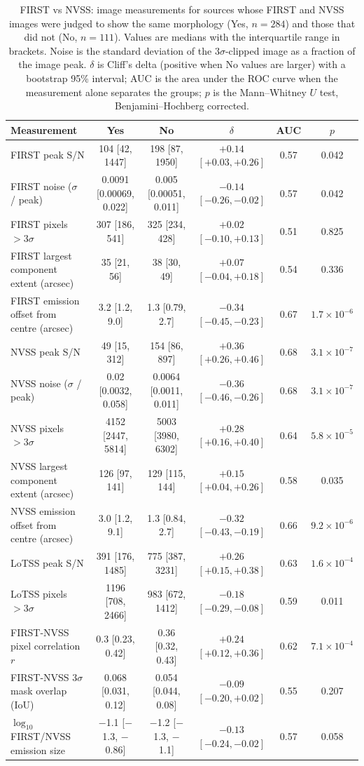 \begin{table}
\centering
\caption{FIRST vs NVSS: image measurements for sources whose FIRST and NVSS images were judged to show the same morphology (Yes, $n=284$) and those that did not (No, $n=111$). Values are medians with the interquartile range in brackets. Noise is the standard deviation of the $3\sigma$-clipped image as a fraction of the image peak. $\delta$ is Cliff's delta (positive when No values are larger) with a bootstrap 95\% interval; AUC is the area under the ROC curve when the measurement alone separates the groups; $p$ is the Mann--Whitney $U$ test, Benjamini--Hochberg corrected.}
\label{tab:morphology_review_FIRST_vs_NVSS}
\begin{tabular}{lccccc}
\hline
Measurement & Yes & No & $\delta$ & AUC & $p$ \\
\hline
FIRST peak S/N & 104 [42, 1447] & 198 [87, 1950] & $+0.14$ $[+0.03, +0.26]$ & 0.57 & 0.042 \\
FIRST noise ($\sigma$ / peak) & 0.0091 [0.00069, 0.022] & 0.005 [0.00051, 0.011] & $-0.14$ $[-0.26, -0.02]$ & 0.57 & 0.042 \\
FIRST pixels $>3\sigma$ & 307 [186, 541] & 325 [234, 428] & $+0.02$ $[-0.10, +0.13]$ & 0.51 & 0.825 \\
FIRST largest component extent (arcsec) & 35 [21, 56] & 38 [30, 49] & $+0.07$ $[-0.04, +0.18]$ & 0.54 & 0.336 \\
FIRST emission offset from centre (arcsec) & 3.2 [1.2, 9.0] & 1.3 [0.79, 2.7] & $-0.34$ $[-0.45, -0.23]$ & 0.67 & $1.7\times10^{-6}$ \\
NVSS peak S/N & 49 [15, 312] & 154 [86, 897] & $+0.36$ $[+0.26, +0.46]$ & 0.68 & $3.1\times10^{-7}$ \\
NVSS noise ($\sigma$ / peak) & 0.02 [0.0032, 0.058] & 0.0064 [0.0011, 0.011] & $-0.36$ $[-0.46, -0.26]$ & 0.68 & $3.1\times10^{-7}$ \\
NVSS pixels $>3\sigma$ & 4152 [2447, 5814] & 5003 [3980, 6302] & $+0.28$ $[+0.16, +0.40]$ & 0.64 & $5.8\times10^{-5}$ \\
NVSS largest component extent (arcsec) & 126 [97, 141] & 129 [115, 144] & $+0.15$ $[+0.04, +0.26]$ & 0.58 & 0.035 \\
NVSS emission offset from centre (arcsec) & 3.0 [1.2, 9.1] & 1.3 [0.84, 2.7] & $-0.32$ $[-0.43, -0.19]$ & 0.66 & $9.2\times10^{-6}$ \\
LoTSS peak S/N & 391 [176, 1485] & 775 [387, 3231] & $+0.26$ $[+0.15, +0.38]$ & 0.63 & $1.6\times10^{-4}$ \\
LoTSS pixels $>3\sigma$ & 1196 [708, 2466] & 983 [672, 1412] & $-0.18$ $[-0.29, -0.08]$ & 0.59 & 0.011 \\
FIRST-NVSS pixel correlation $r$ & 0.3 [0.23, 0.42] & 0.36 [0.32, 0.43] & $+0.24$ $[+0.12, +0.36]$ & 0.62 & $7.1\times10^{-4}$ \\
FIRST-NVSS $3\sigma$ mask overlap (IoU) & 0.068 [0.031, 0.12] & 0.054 [0.044, 0.08] & $-0.09$ $[-0.20, +0.02]$ & 0.55 & 0.207 \\
$\log_{10}$ FIRST/NVSS emission size & $-$1.1 [$-$1.3, $-$0.86] & $-$1.2 [$-$1.3, $-$1.1] & $-0.13$ $[-0.24, -0.02]$ & 0.57 & 0.058 \\
\hline
\end{tabular}
\end{table}